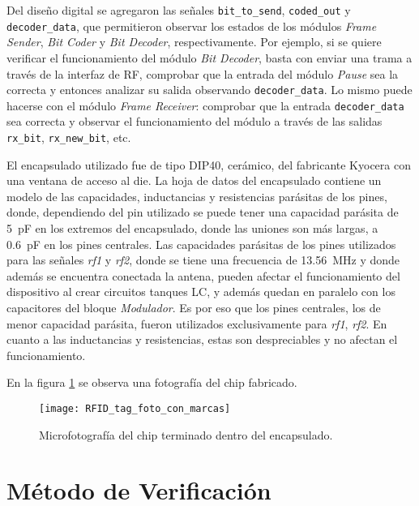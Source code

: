 Del diseño digital se agregaron las señales \lstinline{bit_to_send}, 
\lstinline{coded_out} y \lstinline{decoder_data}, que permitieron 
observar los estados de los módulos \emph{Frame Sender}, \emph{Bit 
Coder} y \emph{Bit Decoder}, respectivamente. Por ejemplo, si se 
quiere verificar el funcionamiento del módulo \emph{Bit Decoder}, 
basta con enviar una trama a través de la interfaz de RF, comprobar 
que la entrada del módulo \emph{Pause} sea la correcta y entonces 
analizar su salida observando \lstinline{decoder_data}. Lo mismo puede 
hacerse con el módulo \emph{Frame Receiver}: comprobar que la entrada 
\lstinline{decoder_data} sea correcta y observar el funcionamiento del 
módulo a través de las salidas \lstinline{rx_bit}, 
\lstinline{rx_new_bit}, etc.

El encapsulado utilizado fue de tipo DIP40, cerámico, del fabricante 
Kyocera \cite{PackageDIP40} con una ventana de acceso al die. La hoja 
de datos del encapsulado contiene un modelo de las capacidades, 
inductancias y resistencias parásitas de los pines, donde, dependiendo 
del pin utilizado se puede tener una capacidad parásita de 
\SI{5}{\pico\farad} en los extremos del encapsulado, donde las uniones 
son más largas, a \SI{0.6}{\pico\farad} en los pines centrales.
Las capacidades parásitas de los pines utilizados para las señales 
\emph{rf1} y \emph{rf2}, donde se tiene una frecuencia de 
\SI{13.56}{\mega\hertz} y donde además se encuentra conectada la 
antena, pueden afectar el funcionamiento del dispositivo al crear 
circuitos tanques LC, y además quedan en paralelo con los capacitores 
del bloque \emph{Modulador}. Es por eso que los pines centrales, los 
de menor capacidad parásita, fueron 
utilizados exclusivamente para \emph{rf1}, \emph{rf2}. En cuanto a las 
inductancias y resistencias, estas son despreciables y no afectan el 
funcionamiento.

En la figura \ref{fig:RFIDTagFoto} se observa una fotografía del 
chip fabricado.

\begin{figure}
	\centering
	\texttt{[image: RFID\_tag\_foto\_con\_marcas]}
	\caption{Microfotografía del chip terminado dentro del encapsulado.}
	\label{fig:RFIDTagFoto}
\end{figure}


\section{Método de Verificación}


